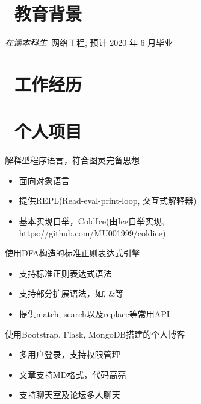 \documentclass{resume}
\begin{document}


 
\section{\faGraduationCap\  教育背景}
\textit{在读本科生}\ 网络工程, 预计 2020 年 6 月毕业

\section{\faUsers\ 工作经历}
\role{实习}{深度学习实习生}

\section{\faGithubAlt\ 个人项目}
解释型程序语言，符合图灵完备思想
\begin{onehalfspacing}
\begin{itemize}
  \item 面向对象语言
  \item 提供REPL(Read-eval-print-loop, 交互式解释器)
  \item 基本实现自举，ColdIce(由Ice自举实现, https://github.com/MU001999/coldice)
\end{itemize}
\end{onehalfspacing}

使用DFA构造的标准正则表达式引擎
\begin{onehalfspacing}
\begin{itemize}
  \item 支持标准正则表达式语法
  \item 支持部分扩展语法，如\^, \&等
  \item 提供match, search以及replace等常用API
\end{itemize}
\end{onehalfspacing}

使用Bootstrap, Flask, MongoDB搭建的个人博客
\begin{onehalfspacing}
\begin{itemize}
  \item 多用户登录，支持权限管理
  \item 文章支持MD格式，代码高亮
  \item 支持聊天室及论坛多人聊天
\end{itemize}
\end{onehalfspacing}
\end{document}
